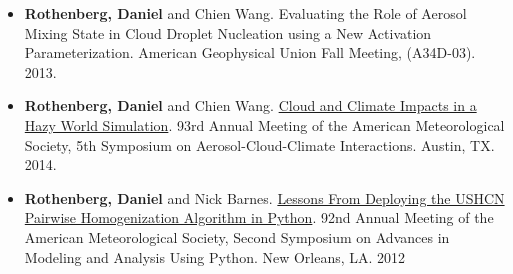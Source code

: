 \documentclass[11pt,letterpaper]{article}
\begin{document}
\begin{itemize}[itemindent=-10pt]
 \item \textbf{Rothenberg, Daniel} and Chien Wang. Evaluating the Role of Aerosol Mixing State in Cloud Droplet Nucleation using a New Activation Parameterization. American Geophysical Union Fall Meeting, (A34D-03). 2013.

 \item \textbf{Rothenberg, Daniel} and Chien Wang. \href{http://figshare.com/articles/AMS_2014_Evaluating_the_Role_of_Aerosol_Mixing_State_in_Cloud_Droplet_Nucleation_towards_Developing_a_New_Activation_Parameterization/918655}{Cloud and Climate Impacts in a Hazy World Simulation}. 93rd Annual Meeting of the American Meteorological Society, 5th Symposium on Aerosol-Cloud-Climate Interactions. Austin, TX. 2014.

 \item \textbf{Rothenberg, Daniel} and Nick Barnes. \href{https://ams.confex.com/ams/92Annual/webprogram/Paper198219.html}{Lessons From Deploying the USHCN Pairwise Homogenization Algorithm in Python}. 92nd Annual Meeting of the American Meteorological Society, Second Symposium on Advances in Modeling and Analysis Using Python. New Orleans, LA. 2012
\end{itemize}
\end{document}
